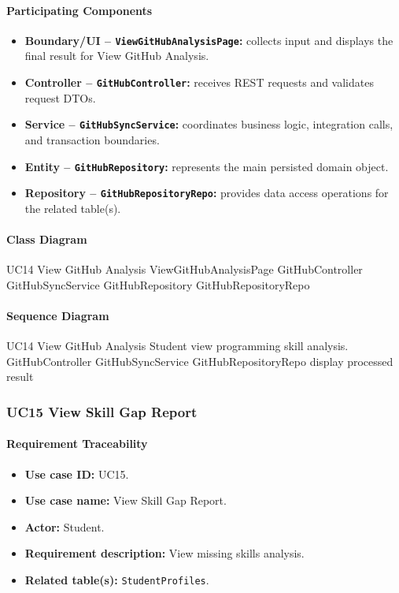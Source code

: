 \paragraph{Participating Components}

\begin{itemize}
    \item \textbf{Boundary/UI -- \texttt{ViewGitHubAnalysisPage}:} collects input and displays the final result for View GitHub Analysis.
    \item \textbf{Controller -- \texttt{GitHubController}:} receives REST requests and validates request DTOs.
    \item \textbf{Service -- \texttt{GitHubSyncService}:} coordinates business logic, integration calls, and transaction boundaries.
    \item \textbf{Entity -- \texttt{GitHubRepository}:} represents the main persisted domain object.
    \item \textbf{Repository -- \texttt{GitHubRepositoryRepo}:} provides data access operations for the related table(s).
\end{itemize}

\paragraph{Class Diagram}

\ClassDiagram
{UC14 View GitHub Analysis}
{ViewGitHubAnalysisPage}
{GitHubController}
{GitHubSyncService}
{GitHubRepository}
{GitHubRepositoryRepo}

\paragraph{Sequence Diagram}

\SequenceDiagram
{UC14 View GitHub Analysis}
{Student}
{view programming skill analysis.}
{GitHubController}
{GitHubSyncService}
{GitHubRepositoryRepo}
{display processed result}

\subsubsection{UC15 View Skill Gap Report}

\paragraph{Requirement Traceability}

\begin{itemize}
    \item \textbf{Use case ID:} UC15.
    \item \textbf{Use case name:} View Skill Gap Report.
    \item \textbf{Actor:} Student.
    \item \textbf{Requirement description:} View missing skills analysis.
    \item \textbf{Related table(s):} \texttt{StudentProfiles}.
\end{itemize}


